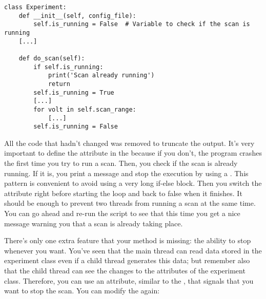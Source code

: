 \begin{verbatim}
class Experiment:
    def __init__(self, config_file):
        self.is_running = False  # Variable to check if the scan is running
    [...]

    def do_scan(self):
        if self.is_running:
            print('Scan already running')
            return
        self.is_running = True
        [...]
        for volt in self.scan_range:
            [...]
        self.is_running = False
\end{verbatim}

All the code that hadn't changed was removed to truncate the output. It's very important to define the  attribute in the  because if you don't, the program crashes the first time you try to run a scan. Then, you check if the scan is already running. If it is, you print a message and stop the execution by using a . This pattern is convenient to avoid using a very long if-else block. Then you switch the attribute right before starting the loop and back to false when it finishes. It should be enough to prevent two threads from running a scan at the same time. You can go ahead and re-run the script to see that this time you get a nice message warning you that a scan is already taking place.


There's only one extra feature that your  method is missing: the ability to stop whenever you want. You've seen that the main thread can read data stored in the experiment class even if a child thread generates this data; but remember also that the child thread can see the changes to the attributes of the experiment class. Therefore, you can use an attribute, similar to the , that signals that you want to stop the scan. You can modify the  again:

